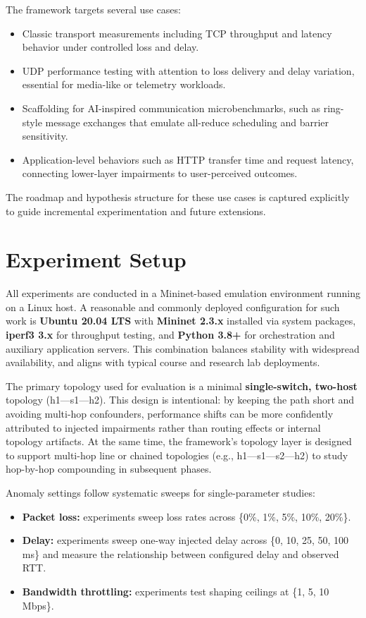 \documentclass[11pt,a4paper]{article}
\begin{document}
The framework targets several use cases:
\begin{itemize}[nosep]
    \item Classic transport measurements including TCP throughput and latency behavior under controlled loss and delay.
    \item UDP performance testing with attention to loss delivery and delay variation, essential for media-like or telemetry workloads.
    \item Scaffolding for AI-inspired communication microbenchmarks, such as ring-style message exchanges that emulate all-reduce scheduling and barrier sensitivity.
    \item Application-level behaviors such as HTTP transfer time and request latency, connecting lower-layer impairments to user-perceived outcomes.
\end{itemize}

The roadmap and hypothesis structure for these use cases is captured explicitly to guide incremental experimentation and future extensions.

\section{Experiment Setup}

All experiments are conducted in a Mininet-based emulation environment running on a Linux host. A reasonable and commonly deployed configuration for such work is \textbf{Ubuntu 20.04 LTS} with \textbf{Mininet 2.3.x} installed via system packages, \textbf{iperf3 3.x} for throughput testing, and \textbf{Python 3.8+} for orchestration and auxiliary application servers. This combination balances stability with widespread availability, and aligns with typical course and research lab deployments.

The primary topology used for evaluation is a minimal \textbf{single-switch, two-host} topology (h1—s1—h2). This design is intentional: by keeping the path short and avoiding multi-hop confounders, performance shifts can be more confidently attributed to injected impairments rather than routing effects or internal topology artifacts. At the same time, the framework's topology layer is designed to support multi-hop line or chained topologies (e.g., h1—s1—s2—h2) to study hop-by-hop compounding in subsequent phases.

Anomaly settings follow systematic sweeps for single-parameter studies:
\begin{itemize}[nosep]
    \item \textbf{Packet loss:} experiments sweep loss rates across \{0\%, 1\%, 5\%, 10\%, 20\%\}.
    \item \textbf{Delay:} experiments sweep one-way injected delay across \{0, 10, 25, 50, 100 ms\} and measure the relationship between configured delay and observed RTT.
    \item \textbf{Bandwidth throttling:} experiments test shaping ceilings at \{1, 5, 10 Mbps\}.
\end{itemize}
\end{document}

